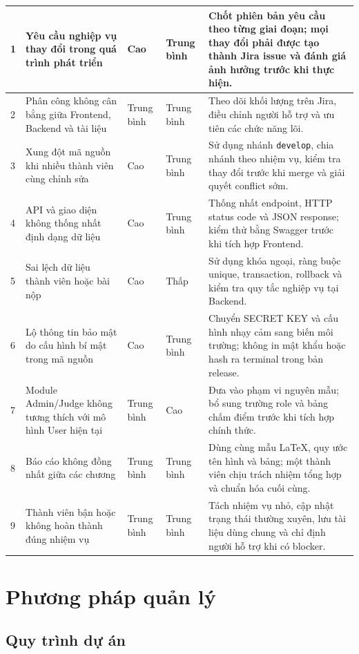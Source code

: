 \begin{longtable}{|p{0.8cm}|p{5.2cm}|p{1.8cm}|p{1.8cm}|p{5.0cm}|}
    1 & Yêu cầu nghiệp vụ thay đổi trong quá trình phát triển & Cao & Trung bình & Chốt phiên bản yêu cầu theo từng giai đoạn; mọi thay đổi phải được tạo thành Jira issue và đánh giá ảnh hưởng trước khi thực hiện. \\
    \hline
    2 & Phân công không cân bằng giữa Frontend, Backend và tài liệu & Trung bình & Trung bình & Theo dõi khối lượng trên Jira, điều chỉnh người hỗ trợ và ưu tiên các chức năng lõi. \\
    \hline
    3 & Xung đột mã nguồn khi nhiều thành viên cùng chỉnh sửa & Cao & Trung bình & Sử dụng nhánh \texttt{develop}, chia nhánh theo nhiệm vụ, kiểm tra thay đổi trước khi merge và giải quyết conflict sớm. \\
    \hline
    4 & API và giao diện không thống nhất định dạng dữ liệu & Cao & Trung bình & Thống nhất endpoint, HTTP status code và JSON response; kiểm thử bằng Swagger trước khi tích hợp Frontend. \\
    \hline
    5 & Sai lệch dữ liệu thành viên hoặc bài nộp & Cao & Thấp & Sử dụng khóa ngoại, ràng buộc unique, transaction, rollback và kiểm tra quy tắc nghiệp vụ tại Backend. \\
    \hline
    6 & Lộ thông tin bảo mật do cấu hình bí mật trong mã nguồn & Cao & Trung bình & Chuyển SECRET KEY và cấu hình nhạy cảm sang biến môi trường; không in mật khẩu hoặc hash ra terminal trong bản release. \\
    \hline
    7 & Module Admin/Judge không tương thích với mô hình User hiện tại & Trung bình & Cao & Đưa vào phạm vi nguyên mẫu; bổ sung trường role và bảng chấm điểm trước khi tích hợp chính thức. \\
    \hline
    8 & Báo cáo không đồng nhất giữa các chương & Trung bình & Trung bình & Dùng cùng mẫu LaTeX, quy ước tên hình và bảng; một thành viên chịu trách nhiệm tổng hợp và chuẩn hóa cuối cùng. \\
    \hline
    9 & Thành viên bận hoặc không hoàn thành đúng nhiệm vụ & Trung bình & Trung bình & Tách nhiệm vụ nhỏ, cập nhật trạng thái thường xuyên, lưu tài liệu dùng chung và chỉ định người hỗ trợ khi có blocker. \\
    \hline
\end{longtable}

\section{Phương pháp quản lý}

\subsection{Quy trình dự án}

